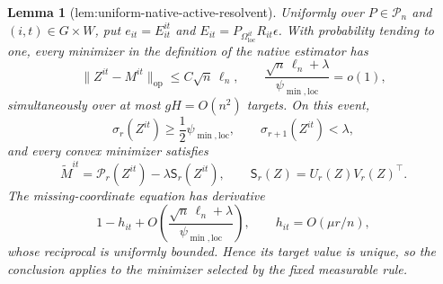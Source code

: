 \documentclass{article}
\newtheorem{lemma}{Lemma}
\begin{document}
\begin{lemma}[lem:uniform-native-active-resolvent]\label{lem:uniform-native-active-resolvent}
Uniformly over \(P\in\mathcal P_n\) and \((i,t)\in G\times W\), put \(e_{it}=E^{it}_{it}\) and \(E_{it}=P_{\Omega_{\mathrm{loc}}^{it}}R_{it}\epsilon\). With probability tending to one, every minimizer in the definition of the native estimator has
\[
 \|Z^{it}-M^{it}\|_{\mathrm{op}}\le C\sqrt n\,\ell_n,
 \qquad
 \frac{\sqrt n\,\ell_n+\lambda}{\psi_{\min,\mathrm{loc}}}=o(1),
\]
simultaneously over at most \(gH=O(n^2)\) targets. On this event,
\[
 \sigma_r(Z^{it})\ge\frac12\psi_{\min,\mathrm{loc}},
 \qquad \sigma_{r+1}(Z^{it})<\lambda,
\]
and every convex minimizer satisfies
\[
 \widetilde M^{it}=\mathcal P_r(Z^{it})-\lambda\mathsf S_r(Z^{it}),
 \qquad \mathsf S_r(Z)=U_r(Z)V_r(Z)^{\top}.
\]
The missing-coordinate equation has derivative
\[
 1-h_{it}+O\!\left(\frac{\sqrt n\,\ell_n+\lambda}
 {\psi_{\min,\mathrm{loc}}}\right),
 \qquad h_{it}=O(\mu r/n),
\]
whose reciprocal is uniformly bounded. Hence its target value is unique, so the conclusion applies to the minimizer selected by the fixed measurable rule.
\end{lemma}
\end{document}

